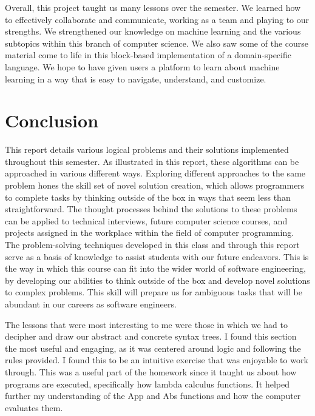 \documentclass{article}
\theoremstyle{theorem}
\theoremstyle{definition}
\theoremstyle{remark}
\begin{document}
Overall, this project taught us many lessons over the semester. We learned how to effectively collaborate and communicate, working as a team and playing to our strengths. We strengthened our knowledge on machine learning and the various subtopics within this branch of computer science. We also saw some of the course material come to life in this block-based implementation of a domain-specific language. We hope to have given users a platform to learn about machine learning in a way that is easy to navigate, understand, and customize. 

\section{Conclusion}\label{conclusions}

This report details various logical problems and their solutions implemented throughout this semester. As illustrated in this report, these algorithms can be approached in various different ways. Exploring different approaches to the same problem hones the skill set of novel solution creation, which allows programmers to complete tasks by thinking outside of the box in ways that seem less than straightforward. The thought processes behind the solutions to these problems can be applied to technical interviews, future computer science courses, and projects assigned in the workplace within the field of computer programming. The problem-solving techniques developed in this class and through this report serve as a basis of knowledge to assist students with our future endeavors. This is the way in which this course can fit into the wider world of software engineering, by developing our abilities to think outside of the box and develop novel solutions to complex problems. This skill will prepare us for ambiguous tasks that will be abundant in our careers as software engineers. 
 
The lessons that were most interesting to me were those in which we had to decipher and draw our abstract and concrete syntax trees. I found this section the most useful and engaging, as it was centered around logic and following the rules provided. I found this to be an intuitive exercise that was enjoyable to work through. This was a useful part of the homework since it taught us about how programs are executed, specifically how lambda calculus functions. It helped further my understanding of the App and Abs functions and how the computer evaluates them. 
\end{document}
